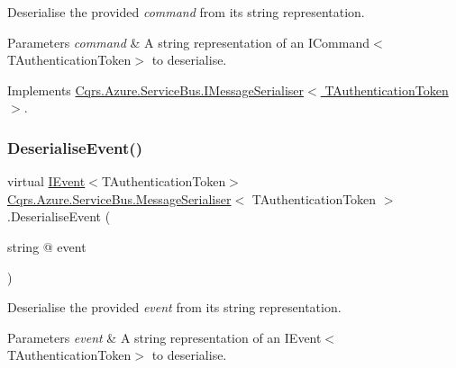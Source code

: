 Deserialise the provided {\itshape command}  from its string representation. 


\begin{DoxyParams}{Parameters}
{\em command} & A string representation of an I\+Command$<$\+T\+Authentication\+Token$>$ to deserialise.\\
\hline
\end{DoxyParams}


Implements \hyperlink{interfaceCqrs_1_1Azure_1_1ServiceBus_1_1IMessageSerialiser_aed98f32ea5f28ee29dad3b3d8bad0d65_aed98f32ea5f28ee29dad3b3d8bad0d65}{Cqrs.\+Azure.\+Service\+Bus.\+I\+Message\+Serialiser$<$ T\+Authentication\+Token $>$}.

\mbox{\label{classCqrs_1_1Azure_1_1ServiceBus_1_1MessageSerialiser_a9207c867f358e352eee5d3727fe620e4_a9207c867f358e352eee5d3727fe620e4}} 
\subsubsection{\texorpdfstring{Deserialise\+Event()}{DeserialiseEvent()}}
{\footnotesize\ttfamily virtual \hyperlink{interfaceCqrs_1_1Events_1_1IEvent}{I\+Event}$<$T\+Authentication\+Token$>$ \hyperlink{classCqrs_1_1Azure_1_1ServiceBus_1_1MessageSerialiser}{Cqrs.\+Azure.\+Service\+Bus.\+Message\+Serialiser}$<$ T\+Authentication\+Token $>$.Deserialise\+Event (\begin{DoxyParamCaption}\item[{string @}]{event }\end{DoxyParamCaption})\hspace{0.3cm}{\ttfamily [virtual]}}



Deserialise the provided {\itshape event}  from its string representation. 


\begin{DoxyParams}{Parameters}
{\em event} & A string representation of an I\+Event$<$\+T\+Authentication\+Token$>$ to deserialise.\\
\hline
\end{DoxyParams}


